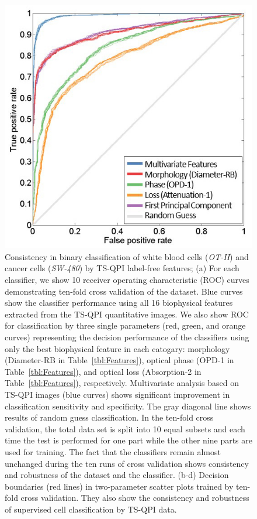 \documentclass[aps,pra,reprint,superscriptaddress]{revtex4-1}
\begin{document}
\begin{figure}
\includegraphics[scale=0.6]{FigureOTSWROC.jpg}
\caption{\label{fig:OTSWROC} Consistency in binary classification of white blood cells (\textit{OT-II}) and cancer cells (\textit{SW-480}) by TS-QPI label-free features; (a) For each classifier, we show 10 receiver operating characteristic (ROC) curves demonstrating ten-fold cross validation of the dataset. Blue curves show the classifier performance using all 16 biophysical features extracted from the TS-QPI quantitative images. We also show ROC for classification by three single parameters (red, green, and orange curves) representing the decision performance of the classifiers using only the best biophysical feature in each catogary: morphology (Diameter-RB in Table~\ref{tbl:Features}), optical phase (OPD-1 in Table~\ref{tbl:Features}), and optical loss (Absorption-2 in Table~\ref{tbl:Features}), respectively. Multivariate analysis based on TS-QPI images (blue curves) shows significant improvement in classification sensitivity and specificity. The gray diagonal line shows results of random guess classification. In the ten-fold cross validation, the total data set is split into 10 equal subsets and each time the test is performed for one part while the other nine parts are used for training. The fact that the classifiers remain almost unchanged during the ten runs of cross validation shows consistency and robustness of the dataset and the classifier. (b-d) Decision boundaries (red lines) in two-parameter scatter plots trained by ten-fold cross validation. They also show the consistency and robustness of supervised cell classification by TS-QPI data.}
\end{figure}
\end{document}
